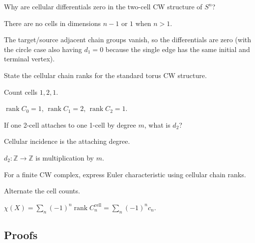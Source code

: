 \begin{exercise}\label{exr:viii18-ped-02}
Why are cellular differentials zero in the two-cell CW structure of $S^n$?
\end{exercise}
\begin{hint}
There are no cells in dimensions $n-1$ or $1$ when $n>1$.
\end{hint}
\begin{solution}
The target/source adjacent chain groups vanish, so the differentials are zero (with the circle case also having $d_1=0$ because the single edge has the same initial and terminal vertex).
\end{solution}

\begin{exercise}\label{exr:viii18-ped-03}
State the cellular chain ranks for the standard torus CW structure.
\end{exercise}
\begin{hint}
Count cells $1,2,1$.
\end{hint}
\begin{solution}
$\operatorname{rank}C_0=1$, $\operatorname{rank}C_1=2$, $\operatorname{rank}C_2=1$.
\end{solution}

\begin{exercise}\label{exr:viii18-ped-04}
If one 2-cell attaches to one 1-cell by degree $m$, what is $d_2$?
\end{exercise}
\begin{hint}
Cellular incidence is the attaching degree.
\end{hint}
\begin{solution}
$d_2:\mathbb Z\to\mathbb Z$ is multiplication by $m$.
\end{solution}

\begin{exercise}\label{exr:viii18-ped-05}
For a finite CW complex, express Euler characteristic using cellular chain ranks.
\end{exercise}
\begin{hint}
Alternate the cell counts.
\end{hint}
\begin{solution}
$\chi(X)=\sum_n(-1)^n\operatorname{rank}C_n^{\mathrm{cell}}=\sum_n(-1)^nc_n$.
\end{solution}

\subsection*{Proofs}

